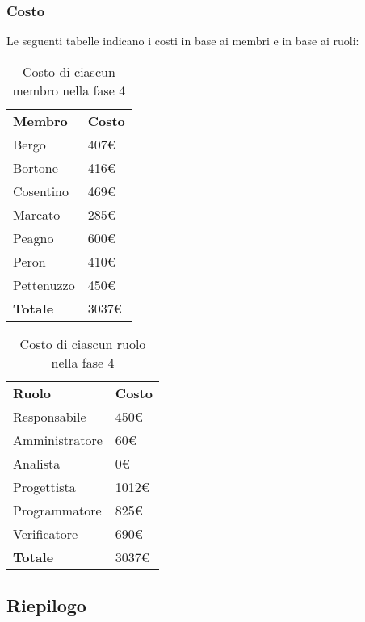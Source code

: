 	\subsubsection{Costo}
		Le seguenti tabelle indicano i costi in base ai membri e in base ai ruoli:
		\begin{table}[h]
			\centering
			\begin{tabular}{| l | l |}
				\rowcolor{LightBlue}
				\textbf{\color{white}Membro}
				& \textbf{\color{white}Costo}\\
				
				Bergo				& 407€\\
				Bortone			& 416€\\
				Cosentino		& 469€\\
				Marcato			& 285€\\
				Peagno				& 600€\\
				Peron				& 410€\\
				Pettenuzzo		& 450€\\ \hline
				\textbf{Totale} & 3037€\\ \hline
			\end{tabular}
			\caption{Costo di ciascun membro nella fase 4}
		\end{table}
		
		\begin{table}[h]
			\centering
			\begin{tabular}{| l | l |}
				\rowcolor{LightBlue}
				\textbf{\color{white}Ruolo}
				& \textbf{\color{white}Costo}\\
				
				Responsabile 		& 450€\\
				Amministratore 	& 60€\\
				Analista 				& 0€\\			
				Progettista 			& 1012€\\
				Programmatore 		& 825€\\
				Verificatore 		& 690€\\ \hline
				\textbf{Totale} 	& 3037€\\ \hline
			\end{tabular}		
			\caption{Costo di ciascun ruolo nella fase 4}
		\end{table}

\newpage
\subsection{Riepilogo}
